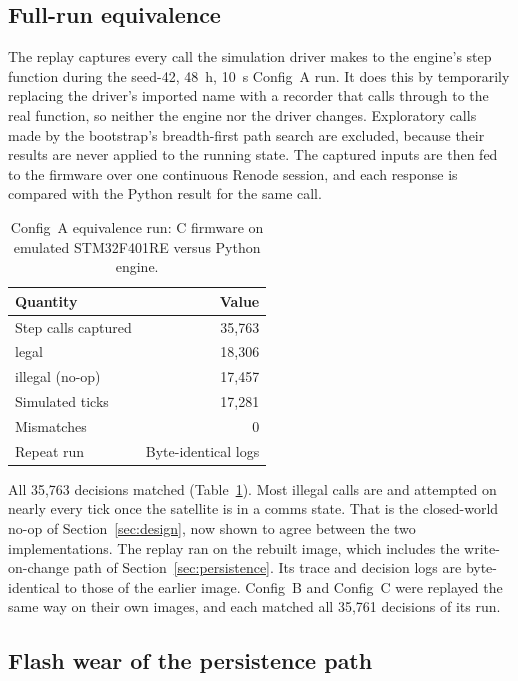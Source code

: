 \documentclass[preprint,12pt]{elsarticle}
\newcommand{\cfgA}{Config~A}
\newcommand{\cfgB}{Config~B}
\newcommand{\cfgC}{Config~C}
\begin{document}
\subsection{Full-run equivalence}

The replay captures every call the simulation driver makes to the engine's step function during the seed-42, 48~h, 10~s \cfgA{} run. It does this by temporarily replacing the driver's imported name with a recorder that calls through to the real function, so neither the engine nor the driver changes. Exploratory calls made by the bootstrap's breadth-first path search are excluded, because their results are never applied to the running state. The captured inputs are then fed to the firmware over one continuous Renode session, and each response is compared with the Python result for the same call.

\begin{table}[t]
\centering
\small
\caption{\cfgA{} equivalence run: C firmware on emulated STM32F401RE versus Python engine.}
\label{tab:cport}
\begin{tabular}{@{}lr@{}}
\toprule
Quantity & Value \\
\midrule
Step calls captured & 35,763 \\
\quad legal & 18,306 \\
\quad illegal (no-op) & 17,457 \\
Simulated ticks & 17,281 \\
Mismatches & 0 \\
Repeat run & Byte-identical logs \\
\bottomrule
\end{tabular}
\end{table}

All 35,763 decisions matched (Table~\ref{tab:cport}). Most illegal calls are  and  attempted on nearly every tick once the satellite is in a comms state. That is the closed-world no-op of Section~\ref{sec:design}, now shown to agree between the two implementations. The replay ran on the rebuilt image, which includes the write-on-change path of Section~\ref{sec:persistence}. Its trace and decision logs are byte-identical to those of the earlier image. \cfgB{} and \cfgC{} were replayed the same way on their own images, and each matched all 35,761 decisions of its run.

\subsection{Flash wear of the persistence path}\label{sec:wear}
\end{document}
